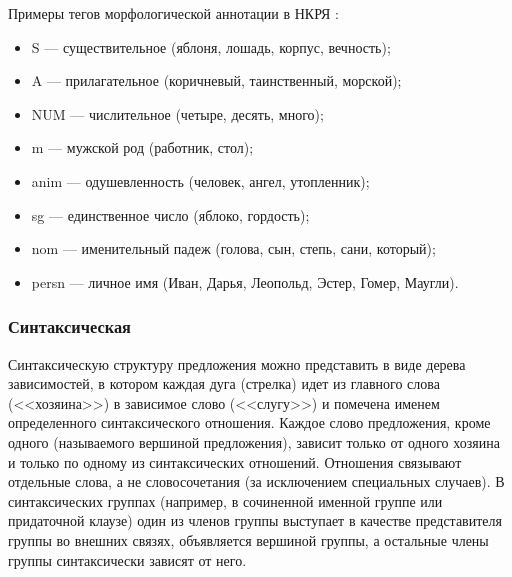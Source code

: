 Примеры тегов морфологической аннотации в НКРЯ \cite{ruscorpora}:
\begin{itemize}
    \item S	--- существительное (яблоня, лошадь, корпус, вечность);
    \item A	--- прилагательное (коричневый, таинственный, морской);
    \item NUM --- числительное (четыре, десять, много);
    \item m	--- мужской род (работник, стол);
    \item anim --- одушевленность (человек, ангел, утопленник);
    \item sg --- единственное число (яблоко, гордость);
    \item nom --- именительный падеж (голова, сын, степь, сани, который);
    \item persn	--- личное имя (Иван, Дарья, Леопольд, Эстер, Гомер, Маугли).
\end{itemize}

\subsubsection*{Синтаксическая}

Синтаксическую структуру предложения можно представить в виде дерева зависимостей, в котором каждая дуга (стрелка) идет из главного слова (<<хозяина>>) в зависимое слово (<<слугу>>) и помечена именем определенного синтаксического отношения.
Каждое слово предложения, кроме одного (называемого вершиной предложения), зависит только от одного хозяина и только по одному из синтаксических отношений.
Отношения связывают отдельные слова, а не словосочетания (за исключением специальных случаев).
В синтаксических группах (например, в сочиненной именной группе или придаточной клаузе) один из членов группы выступает в качестве представителя группы во внешних связях, объявляется вершиной группы, а остальные члены группы синтаксически зависят от него. \cite{ruscorpora}

